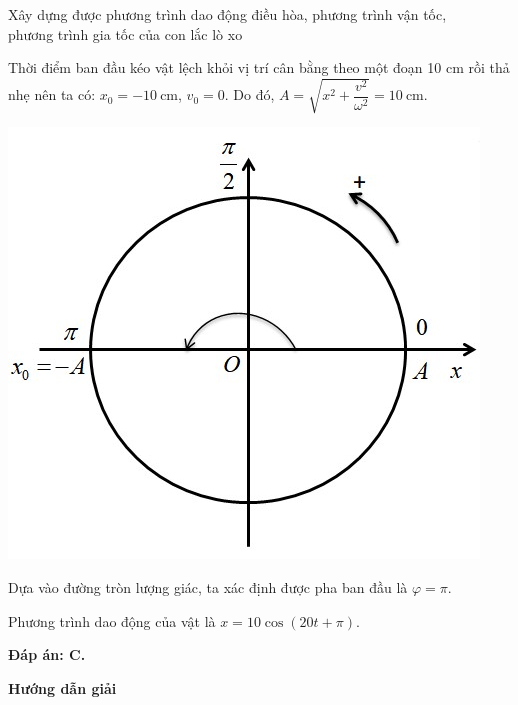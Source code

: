 \begin{dang}{Xây dựng được phương trình dao động điều hòa, phương trình vận tốc,\\ phương trình gia tốc của con lắc lò xo}
{		Thời điểm ban đầu kéo vật lệch khỏi vị trí cân bằng theo một đoạn 10 cm rồi thả nhẹ  nên ta có: $x_0=-10\ \text{cm}$, $v_0=0$. Do đó, $A=\sqrt{x^2+\dfrac{v^2}{\omega^2}}=10\ \text{cm}$.
		\begin{center}
			\includegraphics[scale=0.5]{../figs/VN12-PH-03-A-002-1-V2-1.jpg}
		\end{center}
		
		Dựa vào đường tròn lượng giác, ta xác định được pha ban đầu là $\varphi=\pi$.
		
		Phương trình dao động của vật là $x=10\cos \left( 20t+\pi\right)$.
		
		\textbf{Đáp án: C.}
	}
	{\begin{center}
			\textbf{Hướng dẫn giải}
		\end{center}
		
}
\end{dang}
